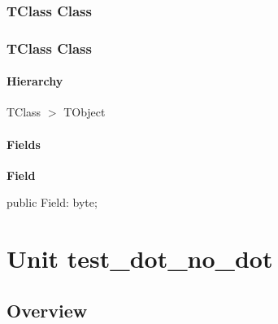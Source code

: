 \documentclass{report}
\newif\ifpdf
\begin{document}
\subsection*{\large{\textbf{TClass Class}}\normalsize\hspace{1ex}\hrulefill}
\else
\subsection*{TClass Class}
\fi
\label{test_dot.two.dots.TClass}
\subsubsection*{\large{\textbf{Hierarchy}}\normalsize\hspace{1ex}\hfill}
TClass {$>$} TObject
\subsubsection*{\large{\textbf{Fields}}\normalsize\hspace{1ex}\hfill}
\begin{list}{}{
\setlength{\itemindent}{0cm}
\setlength{\listparindent}{0cm}
\setlength{\leftmargin}{\evensidemargin}
\addtolength{\leftmargin}{\tmplength}
\settowidth{\labelsep}{X}
\addtolength{\leftmargin}{\labelsep}
\setlength{\labelwidth}{\tmplength}
}
\label{test_dot.two.dots.TClass-Field}
\item[\textbf{Field}\hfill]
\ifpdf
\begin{flushleft}
\fi
\begin{ttfamily}
public Field: byte;\end{ttfamily}

\ifpdf
\end{flushleft}
\fi


\par  \end{list}
\chapter{Unit test{\_}dot{\_}no{\_}dot}
\label{test_dot_no_dot}
\section{Overview}
\begin{description}
\item[\texttt{\begin{ttfamily}TClass\end{ttfamily} Class}]
\end{description}
\end{document}
